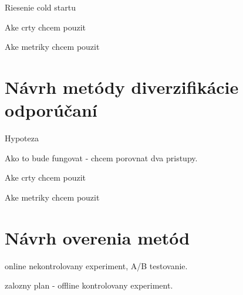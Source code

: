 Riesenie cold startu

Ake crty chcem pouzit

Ake metriky chcem pouzit

\section{Návrh metódy diverzifikácie odporúčaní}

Hypoteza

Ako to bude fungovat - chcem porovnat dva pristupy.

Ake crty chcem pouzit

Ake metriky chcem pouzit

\section{Návrh overenia metód}

online nekontrolovany experiment, A/B testovanie.

zalozny plan - offline kontrolovany experiment.
